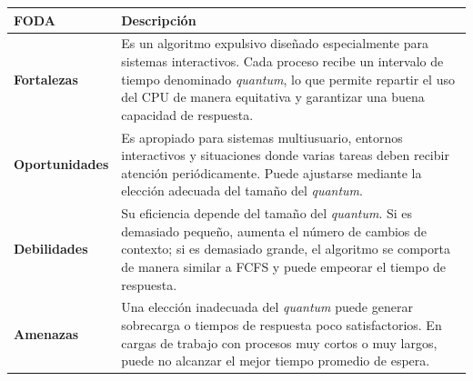 \begin{center}
\begin{tabular}{|p{}|p{}|}
\hline
\textbf{FODA} & \textbf{Descripción} \\ \hline

\textbf{Fortalezas} &
Es un algoritmo expulsivo diseñado especialmente para sistemas interactivos. Cada proceso recibe un intervalo de tiempo denominado \textit{quantum}, lo que permite repartir el uso del CPU de manera equitativa y garantizar una buena capacidad de respuesta. \\ \hline

\textbf{Oportunidades} &
Es apropiado para sistemas multiusuario, entornos interactivos y situaciones donde varias tareas deben recibir atención periódicamente. Puede ajustarse mediante la elección adecuada del tamaño del \textit{quantum}. \\ \hline

\textbf{Debilidades} &
Su eficiencia depende del tamaño del \textit{quantum}. Si es demasiado pequeño, aumenta el número de cambios de contexto; si es demasiado grande, el algoritmo se comporta de manera similar a FCFS y puede empeorar el tiempo de respuesta. \\ \hline

\textbf{Amenazas} &
Una elección inadecuada del \textit{quantum} puede generar sobrecarga o tiempos de respuesta poco satisfactorios. En cargas de trabajo con procesos muy cortos o muy largos, puede no alcanzar el mejor tiempo promedio de espera. \\ \hline

\end{tabular}
\end{center}
